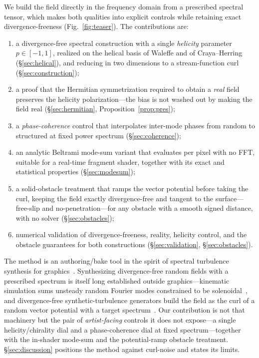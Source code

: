 \documentclass[11pt]{article}
\theoremstyle{remark}
\begin{document}
We build the field directly in the frequency domain from a prescribed spectral tensor, which
makes both qualities into explicit controls while retaining exact divergence-freeness
(Fig.~\ref{fig:teaser}). The contributions are:
\begin{enumerate}[nosep]
\item a divergence-free spectral construction with a single \emph{helicity} parameter
$p\in[-1,1]$, realized on the helical basis of Waleffe and of Craya--Herring
(\S\ref{sec:helical}), and reducing in two dimensions to a stream-function curl
(\S\ref{sec:construction});
\item a proof that the Hermitian symmetrization required to obtain a \emph{real} field
preserves the helicity polarization---the bias is not washed out by making the field real
(\S\ref{sec:hermitian}, Proposition~\ref{prop:pres});
\item a \emph{phase-coherence} control that interpolates inter-mode phases from random to
structured at fixed power spectrum (\S\ref{sec:coherence});
\item an analytic Beltrami mode-sum variant that evaluates per pixel with no FFT, suitable
for a real-time fragment shader, together with its exact and statistical properties
(\S\ref{sec:modesum});
\item a solid-obstacle treatment that ramps the vector potential before taking the curl,
keeping the field exactly divergence-free and tangent to the surface---free-slip and
no-penetration---for any obstacle with a smooth signed distance, with no solver
(\S\ref{sec:obstacles});
\item numerical validation of divergence-freeness, reality, helicity control, and the
obstacle guarantees for both constructions (\S\ref{sec:validation}, \S\ref{sec:obstacles}).
\end{enumerate}
The method is an authoring/bake tool in the spirit of spectral turbulence synthesis for
graphics~\cite{stam1993,kim2008}. Synthesizing divergence-free random fields with a
prescribed spectrum is itself long established outside graphics---kinematic simulation
sums unsteady random Fourier modes constrained to be solenoidal~\cite{fung1992}, and
divergence-free synthetic-turbulence generators build the field as the curl of a random
vector potential with a target spectrum~\cite{saad2017}. Our contribution is not that
machinery but the pair of \emph{artist-facing} controls it does not expose---a single
helicity/chirality dial and a phase-coherence dial at fixed spectrum---together with the
in-shader mode-sum and the potential-ramp obstacle treatment. \S\ref{sec:discussion}
positions the method against curl-noise and states its limits.
\end{document}
